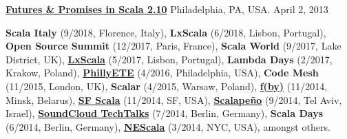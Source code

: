 \documentclass[9pt]{article}
\begin{document}
\noindent\href{http://lampwww.epfl.ch/~hmiller/files/Futures-Try-PhillyETE.pdf}{\bf Futures \& Promises in Scala 2.10} 
\linebreak\noindent Philadelphia, PA, USA. April 2, 2013
\bigskip

{}
\medskip
\newline\noindent
{\bf Scala Italy} (9/2018, Florence, Italy),
{\bf LxScala} (6/2018, Lisbon, Portugal),
{\bf Open Source Summit} (12/2017, Paris, France),
{\bf Scala World} (9/2017, Lake District, UK),
{\bf \href{https://youtu.be/17yy5BwIiTw}{LxScala}} (5/2017, Lisbon, Portugal),
{\bf Lambda Days} (2/2017, Krakow, Poland),
{\bf\href{https://www.youtube.com/watch?v=67UNErFdr64}{PhillyETE}} (4/2016, Philadelphia, USA),
{\bf Code Mesh} (11/2015, London, UK),
{\bf Scalar} (4/2015, Warsaw, Poland),
{\bf\href{http://fby.by/}{f(by)}} (11/2014, Minsk, Belarus),
{\bf\href{https://www.youtube.com/watch?v=4obTnLVXQWY}{SF Scala}} (11/2014, SF, USA),
{\bf\href{http://www.scalapeno.org.il/#!heather-miller/cj0q}{Scalape\~{n}o}} (9/2014, Tel Aviv, Israel),
{\bf \href{https://www.eventbrite.com/e/soundcloud-techtalks-unconventional-thinking-in-design-and-programming-tickets-12166429117}{SoundCloud TechTalks}} (7/2014, Berlin, Germany),
{\bf Scala Days} (6/2014, Berlin, Germany),
{\bf\href{http://www.nescala.org/2014}{NEScala}} (3/2014, NYC, USA), amongst others.

\bigskip



\end{document}
